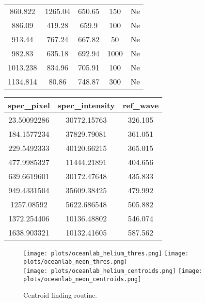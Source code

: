 \documentclass[preprint]{aastex62}
\begin{document}
\begin{table}[H]
\begin{center}
\begin{tabular}{|c|c|c|c|c|}
    860.822     & 1265.04         & 650.65     & 150             & Ne      \\
    886.09      & 419.28          & 659.9      & 100             & Ne      \\
    913.44      & 767.24          & 667.82     & 50              & Ne      \\
    982.83      & 635.18          & 692.94     & 1000            & Ne      \\
    1013.238    & 834.96          & 705.91     & 100             & Ne      \\
    1134.814    & 80.86           & 748.87     & 300             & Ne      \\
    \hline
    \end{tabular}
    \end{center}
\end{table}

\begin{table}[H]
    \begin{center}
    \begin{tabular}{|c|c|c|}
    \hline
    spec\_pixel & spec\_intensity & ref\_wave \\
    \hline \hline
    23.50092286 & 30772.15763     & 326.105   \\
    184.1577234 & 37829.79081     & 361.051   \\
    229.5492333 & 40120.66215     & 365.015   \\
    477.9985327 & 11444.21891     & 404.656   \\
    639.6619601 & 30172.47648     & 435.833   \\
    949.4331504 & 35609.38425     & 479.992   \\
    1257.08592  & 5622.686548     & 505.882   \\
    1372.254406 & 10136.48802     & 546.074   \\
    1638.903321 & 10132.41605     & 587.562   \\
    \hline
    \end{tabular}
    \end{center}
\end{table}

\begin{figure}[]
\begin{center}
\texttt{[image: plots/oceanlab\_helium\_thres.png]}
\texttt{[image: plots/oceanlab\_neon\_thres.png]} \\
\texttt{[image: plots/oceanlab\_helium\_centroids.png]}
\texttt{[image: plots/oceanlab\_neon\_centroids.png]}
\caption{Centroid finding routine.}
\end{center}
\end{figure}
\end{document}
